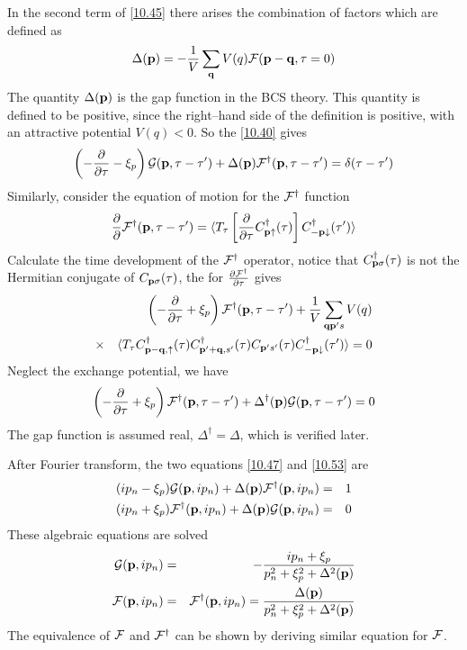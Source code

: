 In the second term of \eqref{10.45} there arises the combination of factors which are defined as
\begin{equation}
    \Delta (\mathbf{p}) = - \frac{1}{V} \sum_{\mathbf{q}} V(q) \mathcal{F}(\mathbf{p}-\mathbf{q},\tau=0)  \label{10.46}
\end{equation}
The quantity $\Delta(\mathbf{p})$ is the gap function in the BCS theory.
This quantity is defined to be positive, since the right--hand side of the definition is positive, with an attractive potential $V(q)<0$.
So the \eqref{10.40} gives
\begin{equation}
    \left( - \frac{\partial}{\partial \tau} - \xi_p \right) \mathcal{G}(\mathbf{p},\tau-\tau') + \Delta(\mathbf{p}) \mathcal{F}^\dagger (\mathbf{p},\tau-\tau') = \delta(\tau-\tau') \label{10.47}
\end{equation}
Similarly, consider the equation of motion for the $\mathcal{F}^\dagger$ function
\begin{equation}
    \frac{\partial}{\partial} \mathcal{F}^\dagger(\mathbf{p},\tau-\tau') = \langle T_\tau \left[ \frac{\partial}{\partial \tau} C^\dagger_{\mathbf{p}\uparrow}(\tau) \right] C_{-\mathbf{p}\downarrow}^\dagger(\tau')    \rangle \label{10.49}
\end{equation}
Calculate the time development of the $\mathcal{F}^\dagger$ operator, notice that $C_{\mathbf{p}\sigma}^\dagger(\tau)$ is not the Hermitian conjugate of $C_{\mathbf{p}\sigma}(\tau)$, the for $ \frac{\partial \mathcal{F}^\dagger}{\partial \tau} $ gives
\begin{eqnarray}
    &~& \left( - \frac{\partial}{\partial \tau} + \xi_p \right) \mathcal{F}^\dagger(\mathbf{p},\tau-\tau') + \frac{1}{V} \sum_{\mathbf{q}\mathbf{p}'s} V(q) \nonumber \\
    &\times& \langle T_\tau C^\dagger_{\mathbf{p}-\mathbf{q},\uparrow}(\tau) C^\dagger_{\mathbf{p}'+\mathbf{q},s'}(\tau) C_{\mathbf{p}'s'}(\tau) C^\dagger_{-\mathbf{p}\downarrow}(\tau') \rangle =0   \label{10.51}
\end{eqnarray}
Neglect the exchange potential, we have
\begin{equation}
    \left( - \frac{\partial}{\partial \tau} + \xi_p \right) \mathcal{F}^\dagger(\mathbf{p},\tau-\tau') + \Delta^\dagger(\mathbf{p}) \mathcal{G}(\mathbf{p},\tau-\tau') = 0   \label{10.53}
\end{equation}
The gap function is assumed real, $\Delta^\dagger = \Delta$, which is verified later.

After Fourier transform, the two equations \eqref{10.47} and \eqref{10.53} are
\begin{eqnarray}
    (ip_n -\xi_p) \mathcal{G}(\mathbf{p}, ip_n) + \Delta(\mathbf{p}) \mathcal{F}^\dagger(\mathbf{p},ip_n) &=& 1 \label{10.55}    \\
    (ip_n + \xi_p) \mathcal{F}^\dagger(\mathbf{p},ip_n) + \Delta(\mathbf{p}) \mathcal{G}(\mathbf{p},ip_n)    &=& 0   \label{10.56}
\end{eqnarray}
These algebraic equations are solved
\begin{eqnarray}
    \mathcal{G} (\mathbf{p},ip_n) &=& - \frac{ip_n+ \xi_p}{p_n^2 + \xi_p^2 + \Delta^2(\mathbf{p})}   \label{10.57} \\
    \mathcal{F} (\mathbf{p},ip_n) &=& \mathcal{F}^\dagger(\mathbf{p},ip_n) = \frac{\Delta(\mathbf{p})}{p_n^2 + \xi_p^2 + \Delta^2(\mathbf{p})} \label{10.58}
\end{eqnarray}
The equivalence of $\mathcal{F}$ and $\mathcal{F}^\dagger$ can be shown by deriving similar equation for $\mathcal{F}$.

